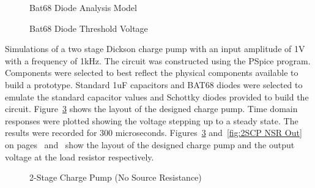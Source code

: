 \documentclass[12pt]{article}
\begin{document}
\begin{figure}[H]
\caption{Bat68 Diode Analysis Model}
\label{fig:Bat68}
\end{figure}

\begin{figure}[H]
\caption{Bat68 Diode Threshold Voltage}
\label{fig:Bat68sim}
\end{figure}

\noindent Simulations of a two stage Dickson charge pump with an input amplitude of 1V with a frequency of 1kHz. The circuit was constructed using the PSpice program. Components were selected to best reflect the physical components available to build a prototype. Standard 1uF capacitors and BAT68 diodes were selected to emulate the standard capacitor values and Schottky diodes provided to build the circuit. Figure~\ref{fig:2SCP NSR} shows the layout of the designed charge pump. Time domain responses were plotted showing the voltage stepping up to a steady state. The results were recorded for 300 microseconds. Figures~\ref{fig:2SCP NSR} and~\ref{fig:2SCP NSR Out} on pages~\pageref{fig:2SCP NSR} and~\pageref{fig:2SCP NSR Out}  show the layout of the designed charge pump and the output voltage at the load resistor respectively.
	
\begin{figure}[H]
\caption{2-Stage Charge Pump (No Source Resistance)}
\label{fig:2SCP NSR}
\end{figure}
\end{document}
